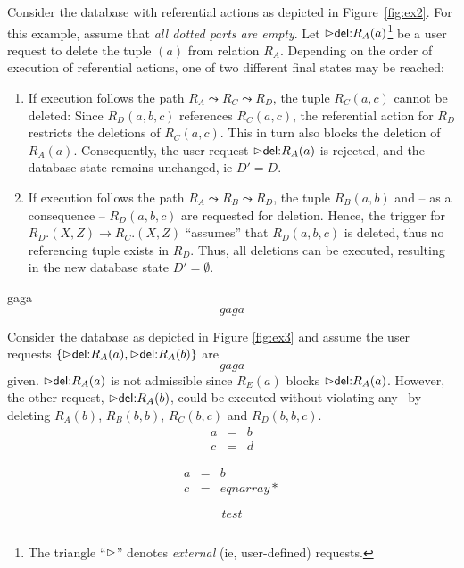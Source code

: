 \documentclass[twoside,11pt]{article}
\theoremstyle{plain}
\begin{document}
\begin{Example}\label{ex:db1}
  Consider the database with referential actions as depicted in
  Figure~\ref{fig:ex2}. For this example, assume that \emph{all dotted
  parts are empty}.  Let $\extev \del R_A(a)$\footnote{The triangle
  ``$\extev$'' denotes \emph{external} (ie, user-defined) requests.}
  be a user request to delete the tuple $(a)$ from relation $R_A$.
  Depending on the order of execution of referential actions, one of
  two different final states may be reached: \einruecktiefe{0.8cm}
\begin{enumerate}
\item[(1)] If execution follows the path $R_A\leadsto R_C\leadsto
  R_D$, the tuple $R_C(a,c)$ cannot be deleted: Since $R_D(a,b,c)$
  references $R_C(a,c)$, the referential action for $R_D$ restricts
  the deletions of $R_C(a,c)$. This in turn also blocks the deletion
  of $R_A(a)$.  Consequently, the user request $\extev \del R_A(a)$ is
  rejected, and the database state remains unchanged, ie $D' = D$.
\item[(2)] If execution follows the path $R_A\leadsto R_B\leadsto
  R_D$, the tuple $R_B(a,b)$ and -- as a consequence -- $R_D(a,b,c)$
  are requested for deletion. Hence, the trigger for $R_D.(X,Z) \to
  R_C.(X,Z)$ ``assumes'' that $R_D(a,b,c)$ is deleted, thus no
  referencing tuple exists in $R_D$. Thus, all deletions can
  be executed, resulting in the new database state $D'=\emptyset$.
\end{enumerate} gaga
\[gaga\]\end{Example}

\begin{Example}\label{ex:refined}
Consider the database as depicted in Figure \ref{fig:ex3} and assume
  the user requests $\{\extev \del R_A(a), \extev \del R_A(b)\}$ are
\[gaga\]
  given.  $\extev \del R_A(a)$ is not admissible since $R_E(a)$ blocks
  $\extev \del R_A(a)$.  However, the other request, $\extev \del R_A(b)$,
  could be executed without violating any \ric\ by deleting $R_A(b)$,
  $R_B(b,b)$, $R_C(b,c)$ and $R_D(b,b,c)$.
  \begin{eqnarray}
    a &=& b \\
    c &=& d    
  \end{eqnarray}
\end{Example}
\begin{Example}
  \begin{eqnarray*}
    a &=& b \\
    c &=& eqnarray*    
  \end{eqnarray*}
\end{Example}
\begin{equation}
  test
\end{equation}
\end{document}

